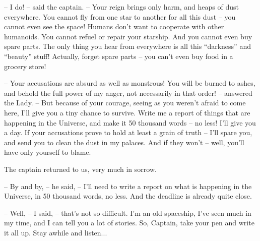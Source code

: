 \documentclass[ebook,twoside,final,openright]{memoir}
\begin{document}
– I do! – said the captain. – Your reign brings only harm, and heaps of dust everywhere. You cannot fly from one star to another for all this dust – you cannot even see the space! Humans don’t want to cooperate with other humanoids. You cannot refuel or repair your starship. And you cannot even buy spare parts. The only thing you hear from everywhere is all this “darkness” and “beauty” stuff! Actually, forget spare parts – you can’t even buy food in a grocery store!\par
– Your accusations are absurd as well as monstrous! You will be burned to ashes, and behold the full power of my anger, not necessarily in that order! – answered the Lady. – But because of your courage, seeing as you weren’t afraid to come here, I'll give you a tiny chance to survive. Write me a report of things that are happening in the Universe, and make it 50 thousand words – no less! I’ll give you a day. If your accusations prove to hold at least a grain of truth – I'll spare you, and send you to clean the dust in my palaces. And if they won’t – well, you’ll have only yourself to blame.\par
\par
The captain returned to us, very much in sorrow.\par
– By and by, – he said, – I’ll need to write a report on what is happening in the Universe, in 50 thousand words, no less. And the deadline is already quite close.\par
– Well, – I said, – that’s not so difficult. I'm an old spaceship, I’ve seen much in my time, and I can tell you a lot of stories. So, Captain, take your pen and write it all up. Stay awhile and listen...
\end{document}
